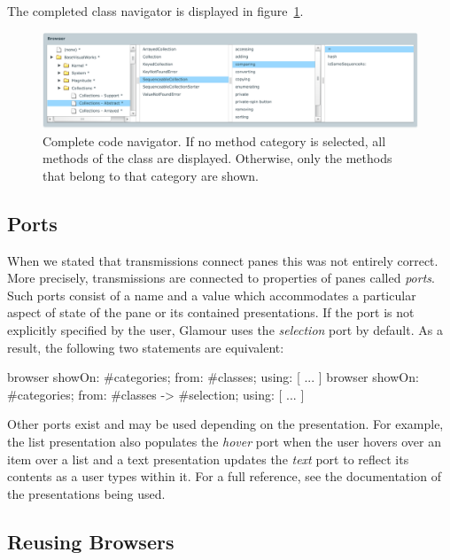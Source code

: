 \documentclass[a4paper,10pt,twoside]{book}
\begin{document}
The completed class navigator is displayed in
figure~\ref{fig:codenavigator}.

\begin{figure}[htbp]
\centerline{\includegraphics[width=\linewidth]{codenavigator.pdf}}
\caption{Complete code navigator. If no method category is selected, all methods of the class
are displayed. Otherwise, only the methods that belong to that category are shown.}
\label{fig:codenavigator}
\end{figure}


\subsection{Ports}

When we stated that transmissions connect panes this was not entirely
correct. More precisely, transmissions are connected to properties of
panes called \emph{ports}. Such ports consist of a name and a value
which accommodates a particular aspect of state of the pane or its
contained presentations. If the port is not explicitly specified by
the user, Glamour uses the \emph{selection} port by default. As a
result, the following two statements are equivalent:

\begin{code}{}
browser showOn: #categories; from: #classes; using: [ ... ]
browser showOn: #categories; from: #classes -> #selection; using: [ ... ]
\end{code}

Other ports exist and may be used depending on the presentation. For
example, the list presentation also populates the \emph{hover} port
when the user hovers over an item over a list and a text presentation
updates the \emph{text} port to reflect its contents as a user types
within it. For a full reference, see the documentation of the
presentations being used.


\subsection{Reusing Browsers}
\label{sec:tutorial/reusing-browsers}
\end{document}
